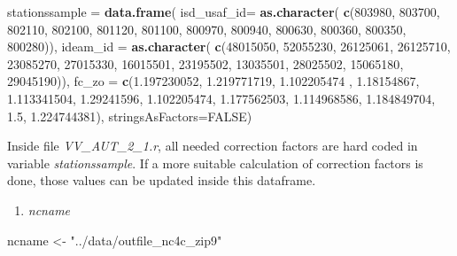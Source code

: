 \documentclass[12pt,oneside]{reedthesis}
\newenvironment{Shaded}{\begin{snugshade}}{\end{snugshade}}
\newcommand{\DataTypeTok}[1]{\textcolor[rgb]{0.13,0.29,0.53}{#1}}
\newcommand{\DecValTok}[1]{\textcolor[rgb]{0.00,0.00,0.81}{#1}}
\newcommand{\FloatTok}[1]{\textcolor[rgb]{0.00,0.00,0.81}{#1}}
\newcommand{\KeywordTok}[1]{\textcolor[rgb]{0.13,0.29,0.53}{\textbf{#1}}}
\newcommand{\NormalTok}[1]{#1}
\newcommand{\OtherTok}[1]{\textcolor[rgb]{0.56,0.35,0.01}{#1}}
\newcommand{\StringTok}[1]{\textcolor[rgb]{0.31,0.60,0.02}{#1}}
\providecommand{\tightlist}{%
  \setlength{\itemsep}{0pt}\setlength{\parskip}{0pt}}
\begin{document}
\vspace{0.4cm}
\begin{Shaded}
\begin{Highlighting}[]
\NormalTok{    stationssample =}\StringTok{ }\KeywordTok{data.frame}\NormalTok{(}
      \DataTypeTok{isd_usaf_id=} \KeywordTok{as.character}\NormalTok{(}
        \KeywordTok{c}\NormalTok{(}\DecValTok{803980}\NormalTok{, }\DecValTok{803700}\NormalTok{, }\DecValTok{802110}\NormalTok{, }\DecValTok{802100}\NormalTok{, }\DecValTok{801120}\NormalTok{, }\DecValTok{801100}\NormalTok{, }
          \DecValTok{800970}\NormalTok{, }\DecValTok{800940}\NormalTok{, }\DecValTok{800630}\NormalTok{, }\DecValTok{800360}\NormalTok{, }\DecValTok{800350}\NormalTok{, }\DecValTok{800280}\NormalTok{)), }
      \DataTypeTok{ideam_id =} \KeywordTok{as.character}\NormalTok{(}
        \KeywordTok{c}\NormalTok{(}\DecValTok{48015050}\NormalTok{, }\DecValTok{52055230}\NormalTok{, }\DecValTok{26125061}\NormalTok{, }\DecValTok{26125710}\NormalTok{, }\DecValTok{23085270}\NormalTok{, }\DecValTok{27015330}\NormalTok{, }
          \DecValTok{16015501}\NormalTok{, }\DecValTok{23195502}\NormalTok{, }\DecValTok{13035501}\NormalTok{, }\DecValTok{28025502}\NormalTok{, }\DecValTok{15065180}\NormalTok{, }\DecValTok{29045190}\NormalTok{)),}
      \DataTypeTok{fc_zo =} 
        \KeywordTok{c}\NormalTok{(}\FloatTok{1.197230052}\NormalTok{, }\FloatTok{1.219771719}\NormalTok{, }\FloatTok{1.102205474}\NormalTok{ , }\FloatTok{1.18154867}\NormalTok{, }\FloatTok{1.113341504}\NormalTok{, }\FloatTok{1.29241596}\NormalTok{, }
          \FloatTok{1.102205474}\NormalTok{, }\FloatTok{1.177562503}\NormalTok{, }\FloatTok{1.114968586}\NormalTok{, }\FloatTok{1.184849704}\NormalTok{, }\FloatTok{1.5}\NormalTok{, }\FloatTok{1.224744381}\NormalTok{),  }
      \DataTypeTok{stringsAsFactors=}\OtherTok{FALSE}\NormalTok{)}
\end{Highlighting}
\end{Shaded}
\normalsize

Inside file \emph{VV\_AUT\_2\_1.r}, all needed correction factors are hard coded in variable \emph{stationssample}. If a more suitable calculation of correction factors is done, those values can be updated inside this dataframe.
\begin{enumerate}
\def\labelenumi{\arabic{enumi}.}
\setcounter{enumi}{2}
\tightlist
\item
  \emph{ncname}
\end{enumerate}
\scriptsize

\vspace{0.4cm}
\begin{Shaded}
\begin{Highlighting}[]
\NormalTok{      ncname <-}\StringTok{ "../data/outfile_nc4c_zip9"}
\end{Highlighting}
\end{Shaded}
\normalsize
\end{document}
